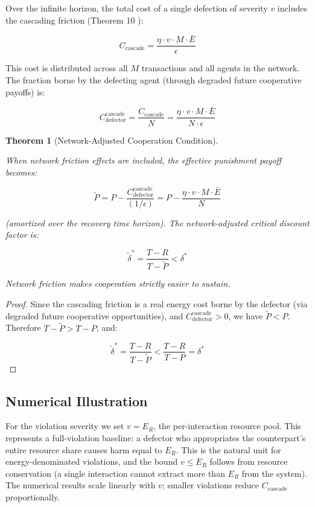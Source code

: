 \documentclass[11pt]{article}
\theoremstyle{plain}
\newtheorem{theorem}{Theorem}
\theoremstyle{definition}
\theoremstyle{remark}
\let\origsubsection\subsection
\renewcommand{\subsection}{\needspace{7\baselineskip}\origsubsection}
\begin{document}
Over the infinite horizon, the total cost of a single defection of
severity \(v\) includes the cascading friction (Theorem 10
\citep{TC-IV}):

\[C_{\text{cascade}} = \frac{\eta \cdot v \cdot M \cdot \bar{E}}{\epsilon}\]

This cost is distributed across all \(M\) transactions and all agents in
the network. The fraction borne by the defecting agent (through degraded
future cooperative payoffs) is:

\[C_{\text{defector}}^{\text{cascade}} = \frac{C_{\text{cascade}}}{N} = \frac{\eta \cdot v \cdot M \cdot \bar{E}}{N \cdot \epsilon}\]

\begin{theorem}[Network-Adjusted Cooperation Condition]
\label{thm-network-adjusted-cooperation}

When network friction effects are included, the effective punishment payoff becomes:

$$\tilde{P} = P - \frac{C_{\text{defector}}^{\text{cascade}}}{(1/\epsilon)} = P - \frac{\eta \cdot v \cdot M \cdot \bar{E}}{N}$$

(amortized over the recovery time horizon). The network-adjusted critical discount factor is:

$$\tilde{\delta}^* = \frac{T - R}{T - \tilde{P}} < \delta^*$$

Network friction makes cooperation strictly easier to sustain.
\end{theorem}

\begin{proof}
Since the cascading friction is a real energy cost borne by the defector (via degraded future cooperative opportunities), and $C_{\text{defector}}^{\text{cascade}} > 0$, we have $\tilde{P} < P$. Therefore $T - \tilde{P} > T - P$, and:

$$\tilde{\delta}^* = \frac{T - R}{T - \tilde{P}} < \frac{T - R}{T - P} = \delta^*$$
\end{proof}

\subsection{Numerical Illustration}\label{numerical-illustration}

For the violation severity we set \(v = E_R\), the per-interaction
resource pool. This represents a full-violation baseline: a defector who
appropriates the counterpart's entire resource share causes harm equal
to \(E_R\). This is the natural unit for energy-denominated violations,
and the bound \(v \leq E_R\) follows from resource conservation (a
single interaction cannot extract more than \(E_R\) from the system).
The numerical results scale linearly with \(v\); smaller violations
reduce \(C_{\text{cascade}}\) proportionally.
\end{document}
